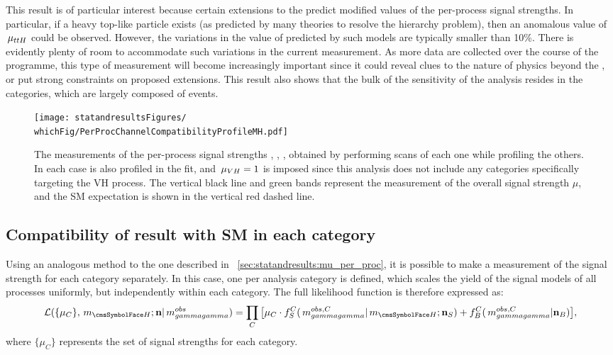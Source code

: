 This result is of particular interest because certain extensions to the \SM predict modified values of the per-process signal strengths. In particular, if a heavy top-like particle exists (as predicted by many theories to resolve the hierarchy problem), then an anomalous value of $\,\mu_{ttH}$ could be observed. However, the variations in the value of \muttH predicted by such models are typically smaller than 10\%. There is evidently plenty of room to accommodate such variations in the current measurement. As more data are collected over the course of the \LHC programme, this type of measurement will become increasingly important since it could reveal clues to the nature of physics beyond the \SM, or put strong constraints on proposed extensions. This result also shows that the bulk of the sensitivity of the analysis resides in the \Untagged categories, which are largely composed of \ggH events.

\begin{figure}[h!]
\centering
\texttt{[image: statandresultsFigures/\\whichFig/PerProcChannelCompatibilityProfileMH.pdf]} 
\caption{The measurements of the per-process signal strengths \muggH, \muVBF, \muttH, obtained by performing \DNLL scans of each one while profiling the others. In each case \mH is also profiled in the fit, and $\,\mu_{VH}=1$ is imposed since this analysis does not include any categories specifically targeting the VH process. The vertical black line and green bands represent the measurement of the overall signal strength $\mu$, and the SM expectation is shown in the vertical red dashed line.}

\label{fig:statandresults:mu_per_proc}

\end{figure}

\subsection{Compatibility of result with SM in each category}

Using an analogous method to the one described in \Sec~\ref{sec:statandresults:mu_per_proc}, it is possible to make a measurement of the signal strength for each category separately. In this case, one \POI per analysis category is defined, which scales the yield of the signal models of all processes uniformly, but independently within each category. The full likelihood function is therefore expressed as:
\begin{equation}
\label{eq:statandresults:likelihood_function}
\mathcal{L}(\{\mu_C\}, \mH; \mathbf{n} | \mgg^{obs} ) = \prod_C \big[\mu_C \cdot f^C_S(\mgg^{obs,C} |\mH; \mathbf{n}_S) + f^C_B(\mgg^{obs,C} | \mathbf{n}_B )\big], 
\end{equation}
where $\{\mu_C\}$ represents the set of signal strengths for each category.

